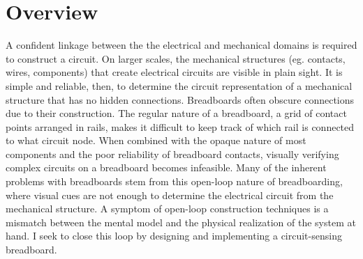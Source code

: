 \documentclass[11pt, a4paper]{article}
\begin{document}
\section{Overview}

A confident linkage between the the electrical and mechanical domains is required to construct a circuit.
On larger scales, the mechanical structures (eg. contacts, wires, components) that create electrical circuits are visible in plain sight. 
It is simple and reliable, then, to determine the circuit representation of a mechanical structure that has no hidden connections. 
Breadboards often obscure connections due to their construction. 
The regular nature of a breadboard, a grid of contact points arranged in rails, makes it difficult to keep track of which rail is connected to what circuit node.
When combined with the opaque nature of most components and the poor reliability of breadboard contacts, visually verifying complex circuits on a breadboard becomes infeasible. 
Many of the inherent problems with breadboards stem from this open-loop nature of breadboarding, where visual cues are not enough to determine the electrical circuit from the mechanical structure. 
A symptom of open-loop construction techniques is a mismatch between the mental model and the physical realization of the system at hand. 
I seek to close this loop by designing and implementing a circuit-sensing breadboard.
\end{document}
